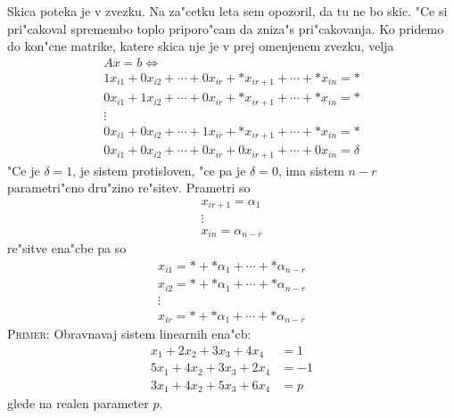 Skica poteka je v zvezku. Na za"cetku leta sem opozoril, da tu ne bo skic. "Ce si pri"cakoval spremembo toplo priporo"cam da zniza"s pri"cakovanja. Ko pridemo do kon"cne matrike, katere skica nje je v prej omenjenem zvezku, velja
\begin{gather*}
Ax = b \iff\\
1 x_{i1} + 0 x_{i2} + \cdots + 0 x_{ir} + \ast x_{ir+1} + \cdots + \ast x_{in} = \ast \\
0 x_{i1} + 1 x_{i2} + \cdots + 0 x_{ir} + \ast x_{ir + 1} + \cdots + \ast x_{in} = \ast \\
\vdots \\
0 x_{i1} + 0 x_{i2} + \cdots + 1 x_{ir} + \ast x_{ir + 1} + \cdots + \ast x_{in} = \ast \\
0 x_{i1} + 0 x_{i2} + \cdots + 0 x_{ir} + 0 x_{ir + 1} + \cdots + 0 x_{in} = \delta
\end{gather*}
"Ce je $\delta = 1$, je sistem protisloven, "ce pa je $\delta = 0$, ima sistem $n - r$ parametri"cno dru"zino re"sitev. Prametri so
\begin{gather*}
x_{ir+1} = \alpha _1 \\
\vdots \\
x_{in} = \alpha_{n-r}
\end{gather*}
re"sitve ena"cbe pa so
\begin{gather*}
x_{i1} = \ast + \ast \alpha_1 + \cdots + \ast \alpha_{n-r} \\
x_{i2} = \ast + \ast \alpha_1 + \cdots + \ast \alpha_{n-r} \\
\vdots \\
x_{ir} = \ast + \ast \alpha_1 + \cdots + \ast \alpha_{n-r}
\end{gather*}
%
\textsc{Primer:} Obravnavaj sistem linearnih ena"cb:
\begin{align*}
x_1 + 2x_2 + 3x_3 + 4x_4 &= 1\\
5x_1 + 4x_2 + 3x_3 + 2x_4 &= -1 \\
3x_1 + 4x_2 + 5x_3 + 6x_4 &= p
\end{align*}
glede na realen parameter $p$.

